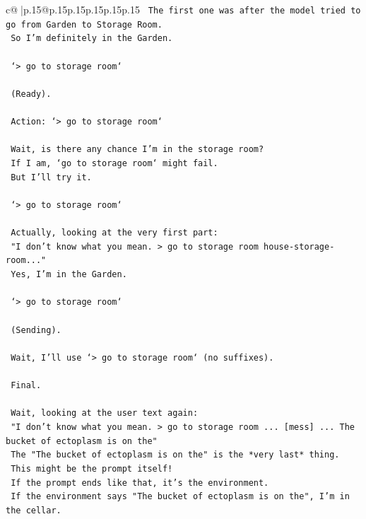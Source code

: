 \documentclass{article}
\begin{document}
{\begin{supertabular}{c@{$\;$}|p{.15\linewidth}@{}p{.15\linewidth}p{.15\linewidth}p{.15\linewidth}p{.15\linewidth}p{.15\linewidth}}
{{{\texttt{    The first one was after the model tried to go from Garden to Storage Room.} \\
\texttt{    So I'm definitely in the Garden.} \\
\\ 
\texttt{    `> go to storage room`} \\
\\ 
\texttt{    (Ready).} \\
\\ 
\texttt{    Action: `> go to storage room`} \\
\\ 
\texttt{    Wait, is there any chance I'm in the storage room?} \\
\texttt{    If I am, `go to storage room` might fail.} \\
\texttt{    But I'll try it.} \\
\\ 
\texttt{    `> go to storage room`} \\
\\ 
\texttt{    Actually, looking at the very first part:} \\
\texttt{    "I don't know what you mean. > go to storage room house{-}storage{-}room..."} \\
\texttt{    Yes, I'm in the Garden.} \\
\\ 
\texttt{    `> go to storage room`} \\
\\ 
\texttt{    (Sending).} \\
\\ 
\texttt{    Wait, I'll use `> go to storage room` (no suffixes).} \\
\\ 
\texttt{    Final.} \\
\\ 
\texttt{    Wait, looking at the user text again:} \\
\texttt{    "I don't know what you mean. > go to storage room ... {[}mess{]} ... The bucket of ectoplasm is on the"} \\
\texttt{    The "The bucket of ectoplasm is on the" is the *very last* thing.} \\
\texttt{    This might be the prompt itself!} \\
\texttt{    If the prompt ends like that, it's the environment.} \\
\texttt{    If the environment says "The bucket of ectoplasm is on the", I'm in the cellar.} \\
}}}
\end{supertabular}}
\end{document}
